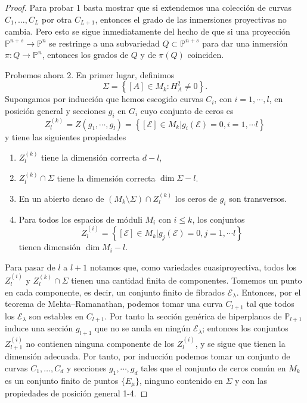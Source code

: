 \documentclass[12pt, a4paper]{amsart}
\newcommand\PP{\mathbb{P}}
\newcommand\EE{\mathscr{E}}
\theoremstyle{remark} \newtheorem{rmk}[thm]{Observación}
\theoremstyle{remark} \newtheorem{rmks}[thm]{Observaciones}
\theoremstyle{definition} \newtheorem{defn}[thm]{Definición}
\theoremstyle{definition} \newtheorem{ejs}[thm]{Ejemplos}
\theoremstyle{definition} \newtheorem{ej}[thm]{Ejemplo}
\begin{document}
\begin{proof}
	Para probar 1 basta mostrar que si extendemos una colección de curvas $C_1,\dots, C_L$ por otra $C_{L+1}$, entonces el grado de las inmersiones proyectivas no cambia. Pero esto se sigue inmediatamente del hecho de que si una proyección $\PP^{n+s} \rightarrow \PP^n$ se restringe a una subvariedad $Q\subset \PP^{n+s}$ para dar una inmersión $\pi:Q\rightarrow \PP^n$, entonces los grados de $Q$ y de $\pi(Q)$ coinciden.	

	Probemos ahora 2. En primer lugar, definimos
\begin{equation*}
\Sigma = \left\{[A]\in M_k : H^2_A \neq 0\right\}.
\end{equation*} 
	Supongamos por inducción que hemos escogido curvas  $C_i$, con $i=1,\cdots,l$, en posición general y secciones  $g_i$ en $G_i$ cuyo conjunto de ceros es
	\begin{equation*}
		Z_l^{(k)}= Z(g_1,\cdots,g_l)=\left\{[\EE]\in M_k | g_i(\EE)=0, i=1,\cdots l\right\}
	\end{equation*} 
	y tiene las siguientes propiedades
	\begin{enumerate}
		\item $Z_l^{(k)}$ tiene la dimensión correcta $d-l$,
		\item $Z_l^{(k)} \cap \Sigma$ tiene la dimensión correcta $\dim \Sigma -l$.
		\item En un abierto denso de $(M_k\setminus \Sigma)\cap Z_l^{(k)}$ los ceros de $g_i$ son transversos.
		\item Para todos los espacios de móduli $M_i$ con $i\leq k$, los conjuntos
			\begin{equation*}
				Z_l^{(i)}=\left\{[\EE]\in M_k | g_j(\EE)=0, j=1,\cdots l\right\}
			\end{equation*} 
			tienen dimensión $\dim M_i -l$.
	\end{enumerate}

	Para pasar de $l$ a $l+1$ notamos que, como variedades cuasiproyectiva, todos los $Z_l^{(i)}$ y $Z_l^{(k)}\cap \Sigma$ tienen una cantidad finita de componentes. Tomemos un punto en cada componente, es decir, un conjunto finito de fibrados $\EE_{\lambda}$. Entonces, por el teorema de Mehta--Ramanathan, podemos tomar una curva $C_{l+1}$ tal que todos los $\EE_{\lambda}$ son estables en $C_{l+1}$. Por tanto la sección genérica de hiperplanos de $\PP_{l+1}$ induce una sección $g_{l+1}$ que no se anula en ningún $\EE_{\lambda}$; entonces los conjuntos $Z_{l+1}^{(i)}$ no contienen ninguna componente de los $Z_l^{(i)}$, y se sigue que tienen la dimensión adecuada. Por tanto, por inducción podemos tomar un conjunto de curvas $C_1,\dots,C_d$ y secciones  $g_1,\cdots, g_d$ tales que el conjunto de ceros común en $M_k$ es un conjunto finito de puntos $\{E_\mu\}$, ninguno contenido en $\Sigma$ y con las propiedades de posición general 1-4.


\end{proof}
\end{document}
